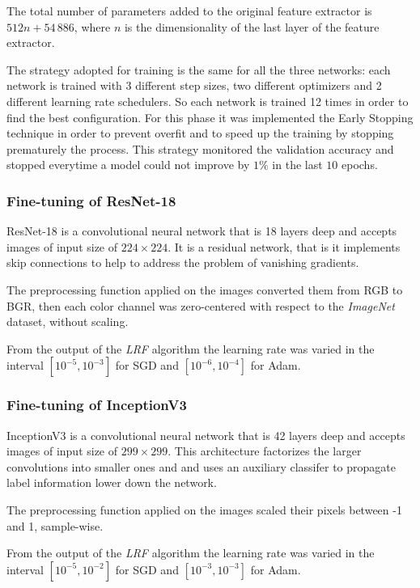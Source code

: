 The total number of parameters added to the original feature extractor is $512n + 54\,886$, where $n$ is the dimensionality of the last layer of the feature extractor.\par
The strategy adopted for training is the same for all the three networks: each network is trained with 3 different step sizes, two different optimizers and 2 different learning rate schedulers. So each network is trained 12 times in order to find the best configuration. For this phase it was implemented the Early Stopping technique in order to prevent overfit and to speed up the training by stopping prematurely the process. This strategy monitored the validation accuracy and stopped everytime a model could not improve by $1\%$ in the last $10$ epochs.



\subsubsection{Fine-tuning of ResNet-18}\label{sec:resnet18}
ResNet-18 is a convolutional neural network that is 18 layers deep and accepts images of input size of $224 \times 224$. It is a residual network, that is it implements skip connections to help to address the problem of vanishing  gradients. \par
The preprocessing function applied on the images converted them from RGB to BGR, then each color channel was zero-centered with respect to the \textit{ImageNet} dataset, without scaling. \par
From the output of the \textit{LRF} algorithm the learning rate was varied in the interval $[10^{-5}, 10^{-3}]$ for SGD and $[10^{-6}, 10^{-4}]$ for Adam.


\subsubsection{Fine-tuning of InceptionV3}\label{sec:inceptionv3}
InceptionV3 is a convolutional neural network that is 42 layers deep and accepts images of input size of $299 \times 299$. This architecture factorizes the larger convolutions  into smaller ones and and uses an auxiliary classifer to propagate label information lower down the network.
 \par
The preprocessing function applied on the images scaled their pixels between -1 and 1, sample-wise. \par
From the output of the \textit{LRF} algorithm the learning rate was varied in the interval $[10^{-5}, 10^{-2}]$ for SGD and $[10^{-3}, 10^{-3}]$ for Adam.


